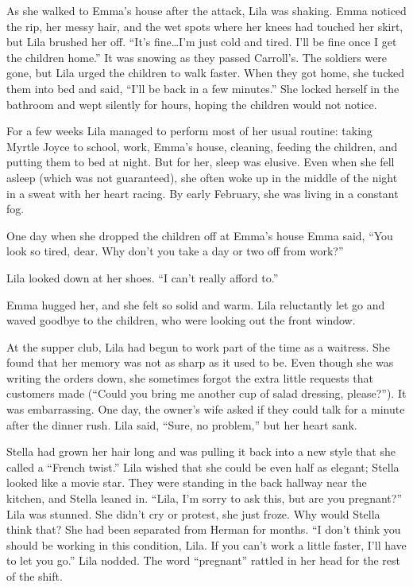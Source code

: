 \documentclass[
  letterpaper,
]{book}
\begin{document}
As she walked to Emma's house after the attack, Lila was shaking. Emma
noticed the rip, her messy hair, and the wet spots where her knees had
touched her skirt, but Lila brushed her off. ``It's fine\ldots I'm just
cold and tired. I'll be fine once I get the children home.'' It was
snowing as they passed Carroll's. The soldiers were gone, but Lila urged
the children to walk faster. When they got home, she tucked them into
bed and said, ``I'll be back in a few minutes.'' She locked herself in
the bathroom and wept silently for hours, hoping the children would not
notice.

For a few weeks Lila managed to perform most of her usual routine:
taking Myrtle Joyce to school, work, Emma's house, cleaning, feeding the
children, and putting them to bed at night. But for her, sleep was
elusive. Even when she fell asleep (which was not guaranteed), she often
woke up in the middle of the night in a sweat with her heart racing. By
early February, she was living in a constant fog.

One day when she dropped the children off at Emma's house Emma said,
``You look so tired, dear. Why don't you take a day or two off from
work?''

Lila looked down at her shoes. ``I can't really afford to.''

Emma hugged her, and she felt so solid and warm. Lila reluctantly let go
and waved goodbye to the children, who were looking out the front
window.

At the supper club, Lila had begun to work part of the time as a
waitress. She found that her memory was not as sharp as it used to be.
Even though she was writing the orders down, she sometimes forgot the
extra little requests that customers made (``Could you bring me another
cup of salad dressing, please?''). It was embarrassing. One day, the
owner's wife asked if they could talk for a minute after the dinner
rush. Lila said, ``Sure, no problem,'' but her heart sank.

Stella had grown her hair long and was pulling it back into a new style
that she called a ``French twist.'' Lila wished that she could be even
half as elegant; Stella looked like a movie star. They were standing in
the back hallway near the kitchen, and Stella leaned in. ``Lila, I'm
sorry to ask this, but are you pregnant?'' Lila was stunned. She didn't
cry or protest, she just froze. Why would Stella think that? She had
been separated from Herman for months. ``I don't think you should be
working in this condition, Lila. If you can't work a little faster, I'll
have to let you go.'' Lila nodded. The word ``pregnant'' rattled in her
head for the rest of the shift.
\end{document}
